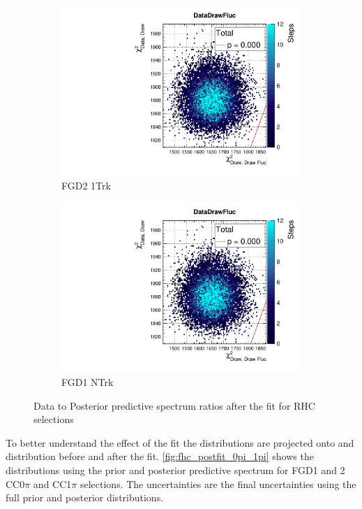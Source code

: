 \begin{figure}[h]
\begin{subfigure}[t]{0.24\textwidth}
	\includegraphics[width=\textwidth, trim={20mm 6mm 4mm 11mm}, clip,page=113]{figures/mach3/data/postpred/2017b_NewData_NewDet_UpdXsecStep_2Xsec_4Det_5Flux_0_PostPred_procs}
	\caption{FGD2 \numu 1Trk}
\end{subfigure}
\begin{subfigure}[t]{0.24\textwidth}
	\includegraphics[width=\textwidth, trim={20mm 6mm 4mm 11mm}, clip,page=122]{figures/mach3/data/postpred/2017b_NewData_NewDet_UpdXsecStep_2Xsec_4Det_5Flux_0_PostPred_procs}
	\caption{FGD1 \numu NTrk}
\end{subfigure}
\caption{Data to Posterior predictive \pmu \cosmu spectrum ratios after the fit for RHC selections}
\label{fig:posterior_pred_data_rhc}
\end{figure}

To better understand the effect of the fit the distributions are projected onto \pmu and \cosmu distribution before and after the fit. \autoref{fig:fhc_postfit_0pi_1pi} shows the distributions using the prior and posterior predictive spectrum for FGD1 and 2 CC0$\pi$ and CC1$\pi$ selections. The uncertainties are the final uncertainties using the full prior and posterior distributions.

